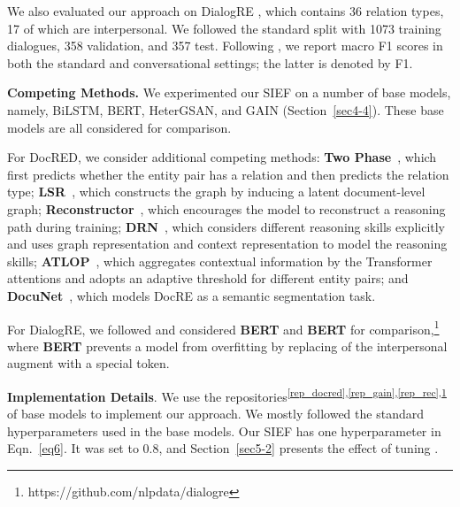\documentclass[11pt]{article}
\begin{document}
We also evaluated our approach on \mbox{DialogRE} \cite[V2,][]{yu-etal-2020-dialogue}, which contains 36 relation types, 17 of which are interpersonal. We followed the standard split with 1073 training dialogues, 358 validation, and 357 test. Following , we report macro F1 scores in both the standard and conversational settings; the latter is denoted by F1.

\textbf{Competing Methods.} We experimented our SIEF on a number of base models, namely, BiLSTM, BERT, HeterGSAN, and GAIN (Section~\ref{sec4-4}). 
These base models are all considered for comparison. 

For DocRED, we consider additional competing methods: 
\textbf{Two Phase}~\cite{Wang2019FinetuneBF}, which first predicts whether the entity pair has a relation and then predicts the relation type;
\textbf{LSR}~\cite{Nan2020ReasoningWL}, which constructs the graph by inducing a latent document-level graph;
\textbf{Reconstructor}~\cite{docred-rec}, which encourages the model to reconstruct a reasoning path during training;
\textbf{DRN}~\cite{xu-etal-2021-discriminative}, which considers different reasoning skills explicitly and uses graph representation and context representation to model the reasoning skills;
\textbf{ATLOP}~\cite{zhou2021atlop}, which aggregates contextual information by the Transformer attentions and adopts an adaptive threshold for different entity pairs;
and \textbf{DocuNet}~\cite{ijcai2021-551}, which models DocRE as a semantic segmentation task.

For DialogRE, we followed  and considered \textbf{BERT} and \textbf{BERT} for comparison,\footnote{https://github.com/nlpdata/dialogre\label{rep_dialog}}
where \textbf{BERT} prevents a model from overfitting by replacing of the interpersonal augment with a special token.

\textbf{Implementation Details}. We use the repositories\textsuperscript{\ref {rep_docred},\ref{rep_gain},\ref{rep_rec},\ref{rep_dialog}} of base models to implement our approach.
We mostly followed the standard hyperparameters used in the base models. 
Our SIEF has one hyperparameter  in Eqn.~\eqref{eq6}. It was set to 0.8, and Section~\ref{sec5-2} presents the effect of tuning .
\end{document}
